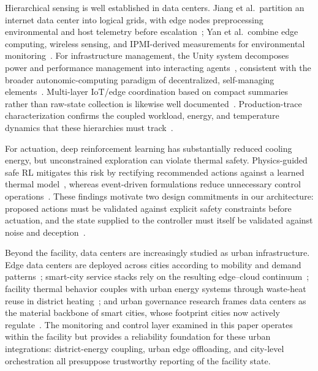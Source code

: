 \documentclass[smartcities,article,submit,moreauthors]{Definitions/mdpi}
\begin{document}
Hierarchical sensing is well established in data centers. Jiang et
al.\ partition an internet data center into logical grids, with edge
nodes preprocessing environmental and host telemetry before
escalation~\cite{jiang2019}; Yan et al.\ combine edge computing,
wireless sensing, and IPMI-derived measurements for environmental
monitoring~\cite{yan2021}. For infrastructure management, the Unity
system decomposes power and performance management into interacting
agents~\cite{das2008}, consistent with the broader autonomic-computing
paradigm of decentralized, self-managing elements~\cite{tesauro2004}.
Multi-layer IoT/edge coordination based on compact summaries rather than
raw-state collection is likewise well documented~\cite{ogino2018,nezami2021}.
Production-trace characterization confirms the coupled workload, energy,
and temperature dynamics that these hierarchies must
track~\cite{ilager2023}.

For actuation, deep reinforcement learning has substantially reduced
cooling energy, but unconstrained exploration can violate thermal safety.
Physics-guided safe RL mitigates this risk by rectifying recommended
actions against a learned thermal model~\cite{wang2024tcps}, whereas
event-driven formulations reduce unnecessary control
operations~\cite{ran2023event}. These findings motivate two design
commitments in our architecture: proposed actions must be validated
against explicit safety constraints before actuation, and the state
supplied to the controller must itself be validated against noise and
deception~\cite{padhan2022}.

Beyond the facility, data centers are increasingly studied as urban
infrastructure. Edge data centers are deployed across cities according to
mobility and demand patterns~\cite{vitello2022}; smart-city service stacks
rely on the resulting edge--cloud continuum~\cite{khan2020smartcities};
facility thermal behavior couples with urban energy systems through
waste-heat reuse in district heating~\cite{huang2020prosumer}; and urban
governance research frames data centers as the material backbone of smart
cities, whose footprint cities now actively regulate~\cite{monstadt2025}.
The monitoring and control layer examined in this paper operates within
the facility but provides a reliability foundation for these urban
integrations: district-energy coupling, urban edge offloading, and
city-level orchestration all presuppose trustworthy reporting of the
facility state.
\end{document}
